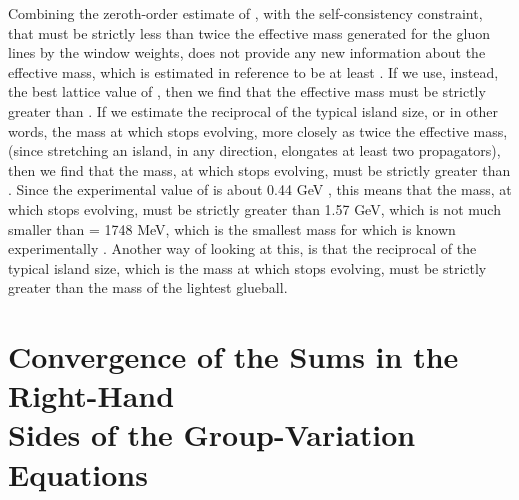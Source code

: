 \documentclass[a4paper,12pt,oneside]{article}
\begin{document}
Combining the zeroth-order estimate of \coordHE{}, with the
self-consistency constraint, that \coordHE{} must be strictly less than
twice the effective mass generated for the gluon lines by the window
weights, does not provide any new information about the effective mass,
which is estimated in reference \cite{GVE} to be at least \myHighlight{$1.3\sqrt{\sigma}$}\coordHE{}.  If we
use, instead, the best lattice value of \coordHE{}, then we find that the
effective mass must be strictly greater than \myHighlight{$1.78\sqrt{\sigma}$}\coordHE{}.  If we
estimate the reciprocal of the typical island size, or in other words, the
mass at which \coordHE{} stops evolving, more closely as twice the effective
mass, (since stretching an island, in any direction, elongates at least two
propagators), then we find that the mass, at which \coordHE{} stops evolving,
must be strictly greater than \myHighlight{$3.56\sqrt{\sigma}$}\coordHE{}.  Since the experimental
value of \myHighlight{$\sqrt{\sigma}$}\coordHE{} is about 0.44 GeV \cite{Michael}, this means that the mass, at
which \coordHE{} stops evolving, must be strictly greater than 1.57 GeV, which is
not much smaller than \coordHE{} = 1748 MeV, which is the smallest mass for
which \coordHE{} is known experimentally \cite{beta in MS bar 1}.
Another way of looking at this, is that the reciprocal of the typical
island size, which is the mass at which \coordHE{} stops evolving, must be
strictly greater than the mass of the lightest glueball.

\section{Convergence of the Sums in the Right-Hand \\Sides of the
Group-Variation Equations}
\label{Convergence}
\end{document}

